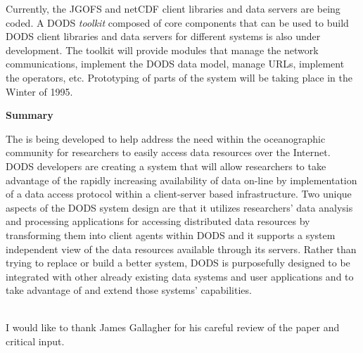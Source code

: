 Currently, the JGOFS and netCDF client libraries and data servers are being
coded.  A DODS {\em toolkit} composed of core components that can be used to
build DODS client libraries and data servers for different systems is also
under development.  The toolkit will provide modules that manage the network
communications, implement the DODS data model, manage URLs, implement the
\dap operators, etc.  Prototyping of parts of the system will be taking
place in the Winter of 1995.

\large
\bigskip
\noindent
{\bf Summary}
\medskip
\normalsize

\noindent
The \dods is being developed to help address the need within the
oceanographic community for researchers to easily access data resources over
the Internet.  DODS developers are creating a system that will allow
researchers to take advantage of the rapidly increasing availability of data
on-line by implementation of a data access protocol within a client-server
based infrastructure.  Two unique aspects of the DODS system design are that
it utilizes researchers' data analysis and processing applications for
accessing distributed data resources by transforming them into client agents
within DODS and it supports a system independent view of the data resources
available through its servers.  Rather than trying to replace or build a
better system, DODS is purposefully designed to be integrated with other
already existing data systems and user applications and to take advantage of
and extend those systems' capabilities.

\medskip
\large
{}\\
\normalsize
I would like to thank James Gallagher for his careful review of the paper and
critical input.




